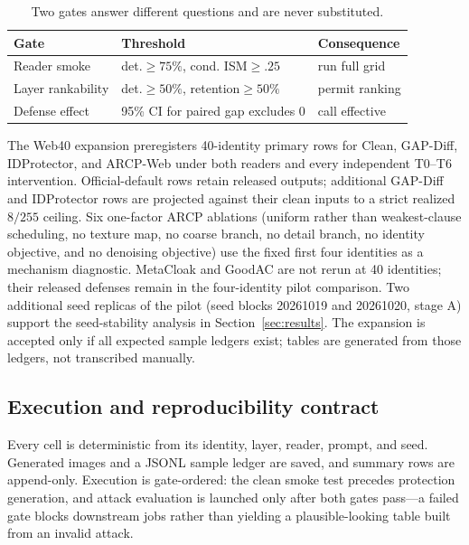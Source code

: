 \begin{table}[t]
\centering
\caption{Two gates answer different questions and are never substituted.}
\label{tab:gates}
\small
\begin{tabular}{lll}
\toprule
Gate & Threshold & Consequence \\
\midrule
Reader smoke & det.$\geq75\%$, cond. ISM$\geq.25$ & run full grid \\
Layer rankability & det.$\geq50\%$, retention$\geq50\%$ & permit ranking \\
Defense effect & 95\% CI for paired gap excludes 0 & call effective \\
\bottomrule
\end{tabular}
\end{table}

The Web40 expansion preregisters 40-identity primary rows for Clean,
GAP-Diff, IDProtector, and ARCP-Web under both readers and every independent
T0--T6 intervention. Official-default rows retain released outputs; additional
GAP-Diff and IDProtector rows are projected against their clean inputs to a
strict realized $8/255$ ceiling. Six one-factor ARCP ablations (uniform rather
than weakest-clause scheduling, no texture map, no coarse branch, no detail
branch, no identity objective, and no denoising objective) use the fixed first
four identities as a mechanism diagnostic. MetaCloak and GoodAC are not rerun
at 40 identities; their released defenses remain in the four-identity pilot
comparison. Two additional seed replicas of the pilot (seed blocks 20261019
and 20261020, stage A) support the seed-stability analysis in
Section~\ref{sec:results}. The expansion is accepted only if
all expected sample ledgers exist; tables are generated from those ledgers,
not transcribed manually.

\subsection{Execution and reproducibility contract}
Every cell is deterministic from its identity, layer, reader, prompt, and
seed. Generated images and a JSONL sample ledger are saved, and summary rows
are append-only. Execution is gate-ordered: the clean smoke test precedes
protection generation, and attack evaluation is launched only after both gates
pass---a failed gate blocks downstream jobs rather than yielding a
plausible-looking table built from an invalid attack.
